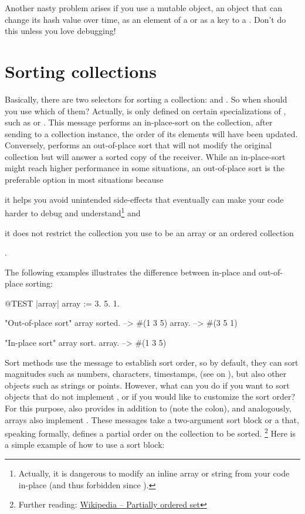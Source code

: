 \documentclass[a4paper,10pt,twoside]{book}
\begin{document}
Another nasty problem arises if you use a mutable object, \ie an object that can change its hash value over time, as an element of a  or as a key to a .
Don't do this unless you love debugging!

\section{Sorting collections}
\label{sec:sorting}
Basically, there are two selectors for sorting a collection:  and .
So when should you use which of them?
Actually,  is only defined on certain specializations of , such as  or .
This message performs an in-place-sort on the collection, \ie after sending  to a collection instance, the order of its elements will have been updated.
Conversely,  performs an out-of-place sort that will not modify the original collection but will answer a sorted copy of the receiver.
While an in-place-sort might reach higher performance in some situations, an out-of-place sort is the preferable option in most situations because \begin{enumerate*}[label={\alph*)}]\item it helps you avoid unintended side-effects that eventually can make your code harder to debug and understand\footnote{%
    Actually, it is dangerous to modify an inline array or string from your code in-place (and thus forbidden since ).%
} and \item it does not restrict the collection you use to be an array or an ordered collection\end{enumerate*}.

The following examples illustrates the difference between in-place and out-of-place sorting:

\begin{code}{@TEST |array|}
array := {3. 5. 1}.

"Out-of-place sort"
array sorted. --> #(1 3 5)
array. --> #(3 5 1)

"In-place sort"
array sort.
array. --> #(1 3 5)
\end{code}

Sort methods use the message  to establish sort order, so by default, they can sort magnitudes such as numbers, characters, timestamps, \etc (see  on ), but also other objects such as strings or points.
However, what can you do if you want to sort objects that do not implement \ct{<=}, or if you would like to customize the sort order?
For this purpose,  also provides  in addition to  (note the colon), and analogously, arrays \etc also implement .
These messages take a two-argument sort block or a  that, speaking formally, defines a partial order on the collection to be sorted.%
\footnote{Further reading: \href{https://en.wikipedia.org/wiki/Partially_ordered_set}{Wikipedia -- Partially ordered set}}
Here is a simple example of how to use a sort block:
\end{document}
